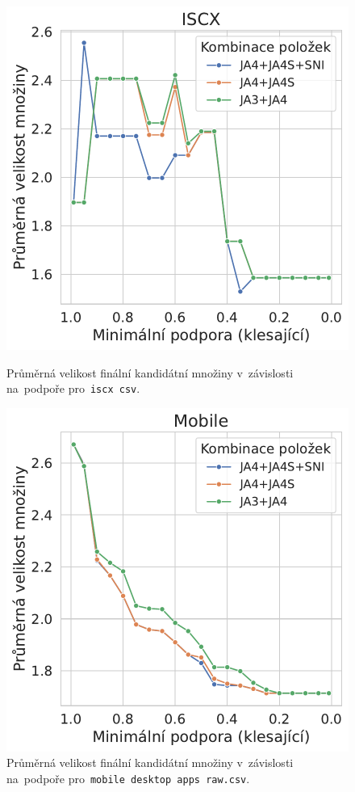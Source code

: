 \begin{figure}[H]
	\centering
	\begin{minipage}[t]{0.49\textwidth}
		\centering
		\includegraphics[width=\linewidth]{obrazky-figures/exps/ex2-candidates_len-iscx.pdf}
		\caption{Průměrná velikost finální kandidátní množiny v~závislosti na~podpoře pro~\texttt{iscx csv}.}
		\label{fig:ex2-iscx-candidates}
	\end{minipage}%
	\hfill
	\begin{minipage}[t]{0.49\textwidth}
		\centering
		\includegraphics[width=\linewidth]{obrazky-figures/exps/ex2-candidates_len-mobile.pdf}
		\caption{Průměrná velikost finální kandidátní množiny v~závislosti na~podpoře pro~\texttt{mobile desktop apps raw.csv}.}
		\label{fig:ex2-mobile-candidates}
	\end{minipage}
\end{figure}

